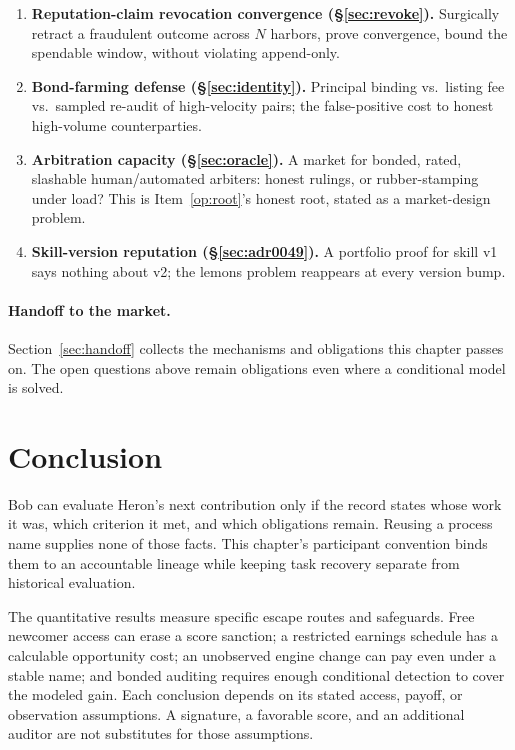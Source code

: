 \documentclass[11pt,a4paper]{article}
\theoremstyle{definition}
\begin{document}
\begin{enumerate}[leftmargin=1.6em]
{  (\S\ref{sec:not-bandit}).} Chiu et
  al.\ 2025: does capping reputation's marginal return restore efficiency or
  relocate the waste?
  \item\label{op:revoke} \textbf{Reputation-claim revocation convergence
  (\S\ref{sec:revoke}).}
  Surgically retract a fraudulent outcome across $N$ harbors, prove convergence,
  bound the spendable window, without violating append-only.
  \item\label{op:bondfarm} \textbf{Bond-farming defense (\S\ref{sec:identity}).}
  Principal binding vs.\
  listing fee vs.\ sampled re-audit of high-velocity pairs; the false-positive cost
  to honest high-volume counterparties.
  \item\label{op:arbitration} \textbf{Arbitration capacity (\S\ref{sec:oracle}).} A
  market for bonded,
  rated, slashable human/automated arbiters: honest rulings, or rubber-stamping
  under load? This is Item~\ref{op:root}'s honest root, stated as a market-design
  problem.
  \item\label{op:skillver} \textbf{Skill-version reputation (\S\ref{sec:adr0049}).}
  A portfolio proof
  for skill v1 says nothing about v2; the lemons problem reappears at every version
  bump.
\end{enumerate}

\paragraph{Handoff to the market.} Section~\ref{sec:handoff} collects the mechanisms
and obligations this chapter passes on. The open questions above
remain obligations even where a conditional model is solved.
\section{Conclusion}\label{sec:conclusion}

Bob can evaluate Heron's next contribution only if the record states whose
work it was, which criterion it met, and which obligations remain. Reusing a
process name supplies none of those facts. This chapter's participant convention
binds them to an accountable lineage while keeping task recovery separate from
historical evaluation.

The quantitative results measure specific escape routes and safeguards. Free
newcomer access can erase a score sanction; a restricted earnings schedule has
a calculable opportunity cost; an unobserved engine change can pay even under
a stable name; and bonded auditing requires enough conditional detection to
cover the modeled gain. Each conclusion depends on its stated access, payoff,
or observation assumptions. A signature, a favorable score, and an additional
auditor are not substitutes for those assumptions.
\end{document}
